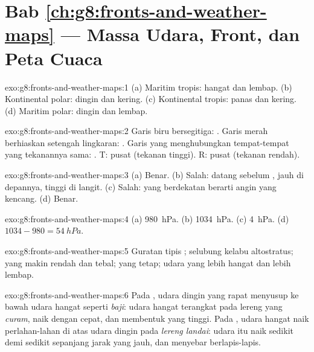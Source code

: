 \section*{Bab \ref{ch:g8:fronts-and-weather-maps} --- Massa Udara, Front, dan Peta Cuaca}

\begin{solution}{exo:g8:fronts-and-weather-maps:1}
(a) Maritim tropis: hangat dan lembap. (b) Kontinental polar: dingin dan
kering. (c) Kontinental tropis: panas dan kering. (d) Maritim polar:
dingin dan lembap.
\end{solution}

\begin{solution}{exo:g8:fronts-and-weather-maps:2}
Garis biru bersegitiga: . Garis merah berhiaskan setengah
lingkaran: . Garis yang menghubungkan tempat-tempat yang
tekanannya sama: . T: pusat  (tekanan tinggi). R: pusat
 (tekanan rendah).
\end{solution}

\begin{solution}{exo:g8:fronts-and-weather-maps:3}
(a) Benar. (b) Salah:  datang sebelum , jauh di depannya,
tinggi di langit. (c) Salah:  yang berdekatan berarti angin yang
kencang. (d) Benar.
\end{solution}

\begin{solution}{exo:g8:fronts-and-weather-maps:4}
(a) \qty{980}{hPa}. (b) \qty{1034}{hPa}. (c) \qty{4}{hPa}. (d) $1034 -
980 = \qty{54}{hPa}$.
\end{solution}

\begin{solution}{exo:g8:fronts-and-weather-maps:5}
Guratan tipis  ; selubung kelabu altostratus;  yang makin
rendah dan tebal;  yang tetap; udara yang lebih hangat dan lebih
lembap.
\end{solution}

\begin{solution}{exo:g8:fronts-and-weather-maps:6}
Pada , udara dingin yang rapat menyusup ke bawah udara hangat
seperti \emph{baji}: udara hangat terangkat pada lereng yang \emph{curam},
naik dengan cepat, dan membentuk  yang tinggi. Pada ,
udara hangat naik perlahan-lahan di atas udara dingin pada \emph{lereng
landai}: udara itu naik sedikit demi sedikit sepanjang jarak yang jauh,
dan  menyebar berlapis-lapis.
\end{solution}

